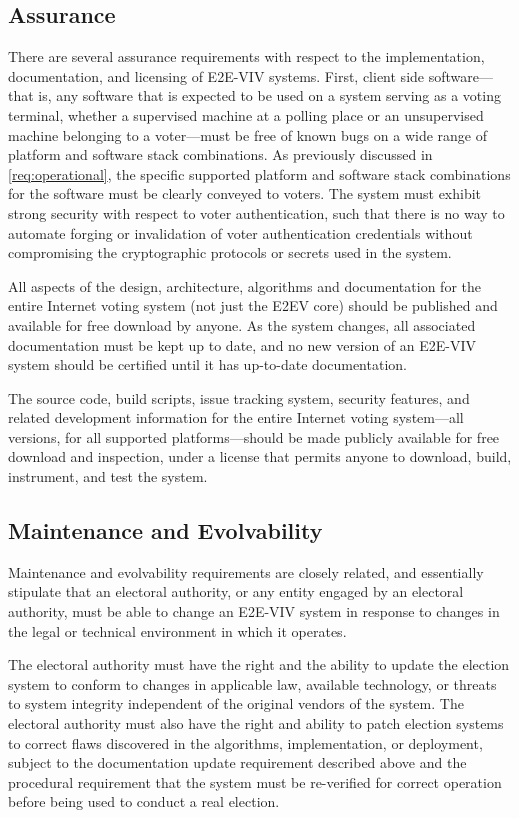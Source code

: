 \subsection{Assurance}

There are several assurance requirements with respect to the
implementation, documentation, and licensing of E2E-VIV
systems. First, client side software---that is, any software that is
expected to be used on a system serving as a voting terminal, whether
a supervised machine at a polling place or an unsupervised machine
belonging to a voter---must be free of known bugs on a wide range of
platform and software stack combinations. As previously discussed in
\autoref{req:operational}, the specific supported platform and
software stack combinations for the software must be clearly conveyed
to voters. The system must exhibit strong security with respect to
voter authentication, such that there is no way to automate forging or
invalidation of voter authentication credentials without compromising
the cryptographic protocols or secrets used in the system.

All aspects of the design, architecture, algorithms and documentation
for the entire Internet voting system (not just the E2EV core) should
be published and available for free download by anyone. As the system
changes, all associated documentation must be kept up to date, and no
new version of an E2E-VIV system should be certified until it has
up-to-date documentation. 

The source code, build scripts, issue tracking system, security
features, and related development information for the entire Internet
voting system---all versions, for all supported platforms---should be
made publicly available for free download and inspection, under a
license that permits anyone to download, build, instrument, and test
the system.

\subsection{Maintenance and Evolvability}

Maintenance and evolvability requirements are closely related, and
essentially stipulate that an electoral authority, or any entity
engaged by an electoral authority, must be able to change an E2E-VIV
system in response to changes in the legal or technical environment in
which it operates. 

The electoral authority must have the right and the ability to update
the election system to conform to changes in applicable law, available
technology, or threats to system integrity independent of the original
vendors of the system. The electoral authority must also have the
right and ability to patch election systems to correct flaws
discovered in the algorithms, implementation, or deployment, subject
to the documentation update requirement described above and the
procedural requirement that the system must be re-verified for correct
operation before being used to conduct a real election.
